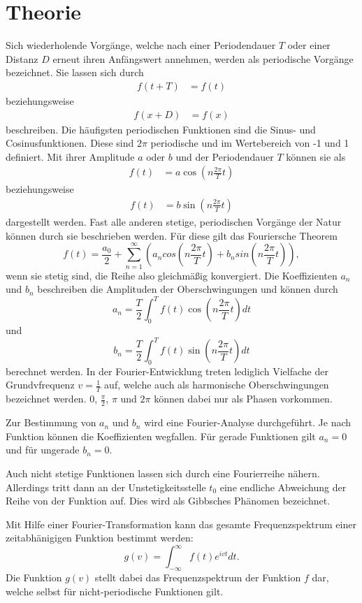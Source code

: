 
\section{Theorie}
Sich wiederholende Vorgänge, welche nach einer Periodendauer $T$ oder einer Distanz $D$
erneut ihren Anfängswert annehmen, werden als periodische Vorgänge bezeichnet.
Sie lassen sich durch
\begin{align}
  f(t+T) &= f(t)
\end{align}
beziehungsweise
\begin{align}
  f(x+D) &= f(x)
\end{align}
beschreiben. Die häufigsten periodischen Funktionen sind die Sinus- und Cosinusfunktionen.
Diese sind $2\pi$ periodische und im Wertebereich von -1 und 1 definiert.
Mit ihrer Amplitude $a$ oder $b$ und der Periodendauer $T$ können sie als
\begin{align}
 f(t) &= a\cos(n\frac{2\pi}{T}t)
\end{align}
beziehungsweise
\begin{align}
 f(t) &= b\sin(n\frac{2\pi}{T}t)
\end{align}
dargestellt werden. Fast alle anderen stetige, periodischen Vorgänge der Natur können
durch sie beschrieben werden. Für diese gilt das Fouriersche Theorem
\begin{equation}
f(t) = \frac{a_0}{2} + \sum_{n=1}^\infty (a_n cos(n\frac{2\pi}{T}t) + b_n sin(n\frac{2\pi}{T}t)),
\end{equation}
wenn sie stetig sind, die Reihe also gleichmäßig konvergiert.
Die Koeffizienten $a_n$ und $b_n$ beschreiben die Amplituden der Oberschwingungen und können durch
\begin{equation}
a_n = \frac{T}{2}\int_{0}^{T} f(t) \cos(n\frac{2\pi}{T}t) dt
\end{equation}
und
\begin{equation}
b_n = \frac{T}{2}\int_{0}^{T} f(t) \sin(n\frac{2\pi}{T}t) dt
\end{equation}
berechnet werden.
In der Fourier-Entwicklung treten lediglich Vielfache der Grundvfrequenz $v = \frac{1}{T}$ auf,
welche auch als harmonische Oberschwingungen bezeichnet werden. 0, $\frac{\pi}{2}$, $\pi$ und $2\pi$
können dabei nur als Phasen vorkommen.
\newline

Zur Bestimmung von $a_n$ und $b_n$ wird eine Fourier-Analyse durchgeführt. Je nach Funktion
können die Koeffizienten wegfallen. Für gerade Funktionen gilt $a_n = 0$ und für ungerade
$b_n = 0$.

Auch nicht stetige Funktionen lassen sich durch eine Fourierreihe nähern. Allerdings tritt
dann an der Unstetigkeitsstelle $t_0$ eine endliche Abweichung der Reihe von der Funktion auf.
Dies wird als Gibbsches Phänomen bezeichnet.

Mit Hilfe einer Fourier-Transformation kann das gesamte Frequenzspektrum einer zeitabhänigigen
Funktion bestimmt werden:
\begin{equation}
g(v) = \int_{-\infty}^{\infty} f(t) e^{ivt} dt.
\end{equation}
Die Funktion $g(v)$ stellt dabei das Frequenzspektrum der Funktion $f$ dar, welche selbst für
nicht-periodische Funktionen gilt.

